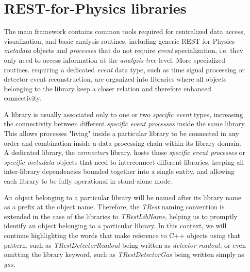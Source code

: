 \section{REST-for-Physics libraries}

\label{sec:libraries}

The main framework contains common tools required for centralized data access, visualization, and basic analysis routines, including generic REST-for-Physics \emph{metadata} objects and \emph{processes} that do not require \emph{event} specialization, i.e. they only need to access information at the \emph{analysis tree} level. More specialized routines, requiring a dedicated \emph{event} data type, such as time signal processing or detector event reconstruction, are organized into libraries where all objects belonging to the library keep a closer relation and therefore enhanced connectivity.

A library is usually associated only to one or two \emph{specific event} types, increasing the connectivity between different \emph{specific event processes} inside the same library. This allows processes "living" inside a particular library to be connected in any order and combination inside a data processing chain within its library domain. A dedicated library, the \emph{connectors} library, hosts those \emph{specific event processes} or \emph{specific metadata} objects that need to interconnect different libraries, keeping all inter-library dependencies bounded together into a single entity, and allowing each library to be fully operational in stand-alone mode.

An object belonging to a particular library will be named after its library name as a prefix at the object name. Therefore, the \emph{TRest} naming convention is extended in the case of the libraries to \emph{TRestLibName}, helping us to promptly identify an object belonging to a particular library. In this context, we will continue highlighting the words that make reference to C++ objects using that pattern, such as \emph{TRestDetectorReadout} being written as \emph{detector readout}, or even omitting the library keyword, such as \emph{TRestDetectorGas} being written simply as \emph{gas}.

